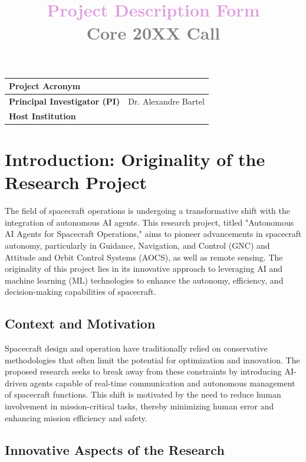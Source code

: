 \documentclass[a4paper, 11pt]{article}
\title{\bf \textcolor{Plum}{Project Description Form} \\ \textcolor{Gray}{Core 20XX Call}}
\author{\vspace{-5ex}}
\date{\vspace{-5ex}}
\begin{document}
\vspace{10cm}
\maketitle

\begin{center}
\begin{tabular}{|p{4.5cm}|p{}|}
\hline
\bf Project Acronym  &  \\ \hline
\bf Principal Investigator (PI)  &  Dr. Alexandre Bartel \\ \hline
\bf Host Institution  & \\ \hline
\end{tabular}
\end{center}

\newpage
\section{Introduction: Originality of the Research Project}

The field of spacecraft operations is undergoing a transformative shift with the integration of autonomous AI agents. This research project, titled "Autonomous AI Agents for Spacecraft Operations," aims to pioneer advancements in spacecraft autonomy, particularly in Guidance, Navigation, and Control (GNC) and Attitude and Orbit Control Systems (AOCS), as well as remote sensing. The originality of this project lies in its innovative approach to leveraging AI and machine learning (ML) technologies to enhance the autonomy, efficiency, and decision-making capabilities of spacecraft.

\subsection{Context and Motivation}

Spacecraft design and operation have traditionally relied on conservative methodologies that often limit the potential for optimization and innovation. The proposed research seeks to break away from these constraints by introducing AI-driven agents capable of real-time communication and autonomous management of spacecraft functions. This shift is motivated by the need to reduce human involvement in mission-critical tasks, thereby minimizing human error and enhancing mission efficiency and safety.

\subsection{Innovative Aspects of the Research}
\end{document}
